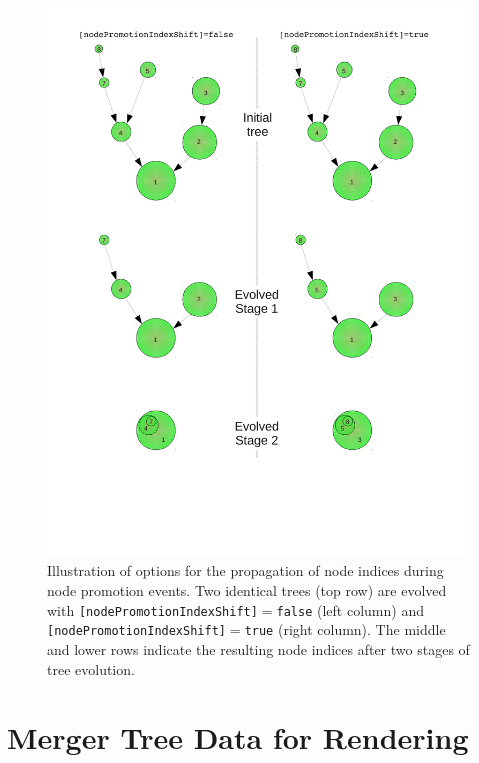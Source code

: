 \begin{figure}
 \begin{center}
 \includegraphics[width=140mm]{Diagrams/NodePromotionIndices.pdf}
 \end{center}
 \caption{Illustration of options for the propagation of node indices during node promotion events. Two identical trees (top row) are evolved with {\tt [nodePromotionIndexShift]}$=${\tt false} (left column) and {\tt [nodePromotionIndexShift]}$=${\tt true} (right column). The middle and lower rows indicate the resulting node indices after two stages of tree evolution.}
 \label{fig:NodePromotionIndexAlgorithms}
\end{figure}

\section{Merger Tree Data for Rendering}


